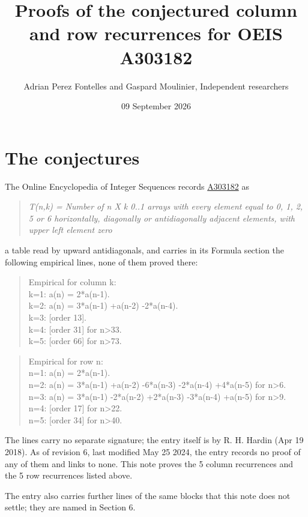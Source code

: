 \documentclass[11pt]{article}
\title{Proofs of the conjectured column and row recurrences for OEIS A303182}
\author{Adrian Perez Fontelles and Gaspard Moulinier, Independent researchers}
\date{09 September 2026}
\theoremstyle{definition}
\begin{document}
\maketitle
\section{The conjectures}

The Online Encyclopedia of Integer Sequences records \href{https://oeis.org/A303182}{A303182} as

\begin{quote}\itshape T(n,k) = Number of n X k 0..1 arrays with every element equal to 0, 1, 2, 5 or 6 horizontally, diagonally or antidiagonally adjacent elements, with upper left element zero\end{quote}

a table read by upward antidiagonals, and carries in its Formula section the following empirical lines, none of them proved there:

\begin{quote}\ttfamily Empirical for column k:\\
k=1: a(n) = 2*a(n-1).\\k=2: a(n) = 3*a(n-1) +a(n-2) -2*a(n-4).\\k=3: [order 13].\\k=4: [order 31] for n>33.\\k=5: [order 66] for n>73.\end{quote}

\begin{quote}\ttfamily Empirical for row n:\\
n=1: a(n) = 2*a(n-1).\\n=2: a(n) = 3*a(n-1) +a(n-2) -6*a(n-3) -2*a(n-4) +4*a(n-5) for n>6.\\n=3: a(n) = 3*a(n-1) -2*a(n-2) +2*a(n-3) -3*a(n-4) +a(n-5) for n>9.\\n=4: [order 17] for n>22.\\n=5: [order 34] for n>40.\end{quote}

The lines carry no separate signature; the entry itself is by R. H. Hardin (Apr 19 2018). As of revision 6, last modified May 25 2024, the entry records no proof of any of them and links to none. This note proves the 5 column recurrences and the 5 row recurrences listed above.

The entry also carries further lines of the same blocks that this note does not settle; they are named in Section 6.
\end{document}

